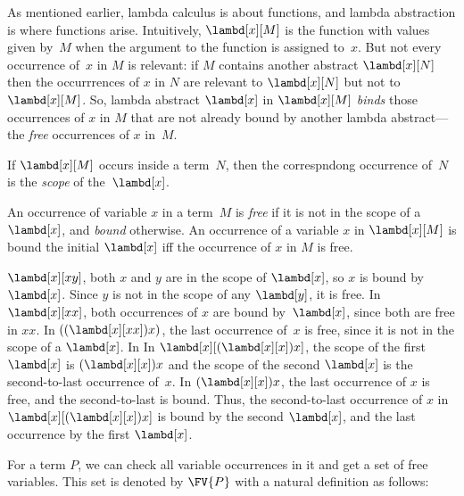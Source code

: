 \documentclass[../../../include/open-logic-section]{subfiles}
\begin{document}

As mentioned earlier, lambda calculus is about functions, and lambda
abstraction is where functions arise. Intuitively, $\lambd[x][M]$ is
the function with values given by~$M$ when the argument to the
function is assigned to~$x$. But not every occurrence of~$x$ in $M$ is
relevant: if $M$ contains another abstract $\lambd[x][N]$ then the
occurrrences of $x$ in $N$ are relevant to $\lambd[x][N]$ but not to
$\lambd[x][M]$.  So, lambda abstract $\lambd[x]$ in $\lambd[x][M]$
\emph{binds} those occurrences of $x$ in $M$ that are not already
bound by another lambda abstract---the \emph{free} occurrences of $x$
in~$M$.

\begin{defn}[Scope]
If $\lambd[x][M]$ occurs inside a term~$N$, then the correspndong
occurrence of~$N$ is the \emph{scope} of the~$\lambd[x]$.
\end{defn}


\begin{defn}
  An occurrence of variable $x$ in a term~$M$ is \emph{free} if it is
  not in the scope of a $\lambd[x]$, and \emph{bound} otherwise. An
  occurrence of a variable $x$ in $\lambd[x][M]$ is bound the initial
  $\lambd[x]$ iff the occurrence of $x$ in $M$ is free.
\end{defn}

\begin{ex}
  $\lambd[x][x y]$, both $x$ and $y$ are in the scope of $\lambd[x]$,
  so $x$ is bound by $\lambd[x]$. Since $y$ is not in the scope of
  any $\lambd[y]$, it is free.  In $\lambd[x][x x]$, both occurrences
  of $x$ are bound by~$\lambd[x]$, since both are free in $xx$.  In
  $((\lambd[x][xx])x)$, the last occurrence of~$x$ is free, since it
  is not in the scope of a $\lambd[x]$. In In
  $\lambd[x][(\lambd[x][x])x]$, the scope of the first $\lambd[x]$ is
  $(\lambd[x][x])x$ and the scope of the second $\lambd[x]$ is the
  second-to-last occurrence of~$x$. In $(\lambd[x][x])x$, the last
  occurrence of $x$ is free, and the second-to-last is bound.  Thus,
  the second-to-last occurrence of $x$ in $\lambd[x][(\lambd[x][x])x]$
  is bound by the second $\lambd[x]$, and the last occurrence by the
  first $\lambd[x]$.
\end{ex}

For a term $P$, we can check all variable occurrences in it and get a
set of free variables. This set is denoted by $\FV{P}$ with a natural
definition as follows:
\end{document}
